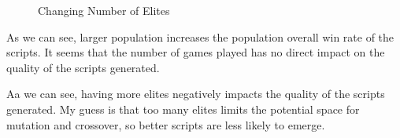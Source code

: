 \documentclass[]{article}
\begin{document}
\begin{figure}[h]%
  \centering
  \qquad
  \qquad
  \caption{Changing Number of Elites}%
  \label{fig:example}%
\end{figure}

As we can see, larger population increases the population overall win
rate of the scripts.
It seems that the number of games played has no direct impact on the
quality of the scripts generated.

Aa we can see, having more elites negatively impacts the quality of the
scripts generated. My guess is that too many elites limits the potential
space for mutation and crossover, so better scripts are less likely to
emerge.
\end{document}
